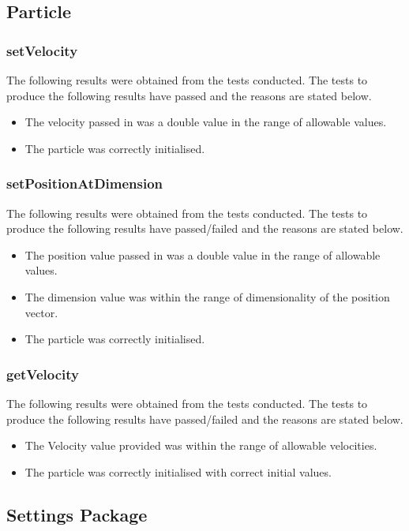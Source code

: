 \documentclass[11pt]{article}
\begin{document}
\subsection{Particle}
\subsubsection{setVelocity}
The following results were obtained from the tests conducted. The tests to produce the
following results have passed and the reasons are stated below.

\begin{itemize}
	\item The velocity passed in was a double value in the range of allowable values.
	\item The particle was correctly initialised.
\end{itemize}
\subsubsection{setPositionAtDimension}
The following results were obtained from the tests conducted. The tests to produce the
following results have passed/failed and the reasons are stated below.

\begin{itemize}
	\item The position value passed in was a double value in the range of allowable values.
	\item The dimension value was within the range of dimensionality of the position vector.
	\item The particle was correctly initialised.
\end{itemize}
\subsubsection{getVelocity}
The following results were obtained from the tests conducted. The tests to produce the
following results have passed/failed and the reasons are stated below.

\begin{itemize}
	\item The Velocity value provided was within the range of allowable velocities.
	\item The particle was correctly initialised with correct initial values.
\end{itemize}
\subsection{Settings Package}
\end{document}
